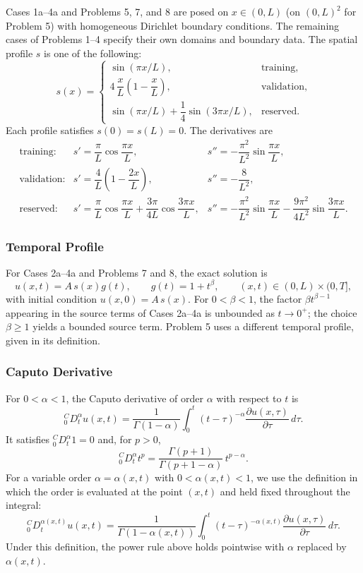 \documentclass[11pt]{article}
\newcommand{\Caputo}[1]{{}^{C}_{0}D_t^{#1}}
\begin{document}
Cases 1a--4a and Problems 5, 7, and 8 are posed on $x\in(0,L)$ (on
$(0,L)^2$ for Problem 5) with homogeneous Dirichlet boundary conditions.
The remaining cases of Problems 1--4 specify their own domains and
boundary data. The spatial
profile $s$ is one of the following:
\[
s(x)=
\begin{cases}
\sin(\pi x/L),
& \text{training},\\[4pt]
4\,\dfrac{x}{L}\left(1-\dfrac{x}{L}\right),
& \text{validation},\\[6pt]
\sin(\pi x/L)+\dfrac14\sin(3\pi x/L),
& \text{reserved}.
\end{cases}
\]
Each profile satisfies $s(0)=s(L)=0$. The derivatives are
\[
\begin{array}{lll}
\text{training:} &
s'=\dfrac{\pi}{L}\cos\dfrac{\pi x}{L}, &
s''=-\dfrac{\pi^2}{L^2}\sin\dfrac{\pi x}{L},\\[10pt]
\text{validation:} &
s'=\dfrac{4}{L}\left(1-\dfrac{2x}{L}\right), &
s''=-\dfrac{8}{L^2},\\[10pt]
\text{reserved:} &
s'=\dfrac{\pi}{L}\cos\dfrac{\pi x}{L}+\dfrac{3\pi}{4L}\cos\dfrac{3\pi x}{L}, &
s''=-\dfrac{\pi^2}{L^2}\sin\dfrac{\pi x}{L}-\dfrac{9\pi^2}{4L^2}\sin\dfrac{3\pi x}{L}.
\end{array}
\]

\subsubsection*{Temporal Profile}

For Cases 2a--4a and Problems 7 and 8, the exact solution is
\[
u(x,t)=A\,s(x)g(t),
\qquad
g(t)=1+t^\beta,
\qquad
(x,t)\in(0,L)\times(0,T],
\]
with initial condition $u(x,0)=A\,s(x)$. For $0<\beta<1$, the factor
$\beta t^{\beta-1}$ appearing in the source terms of Cases 2a--4a is
unbounded as $t\to0^+$; the choice $\beta\ge1$ yields a bounded source
term. Problem 5 uses a different temporal profile, given in its
definition.

\subsubsection*{Caputo Derivative}

For $0<\alpha<1$, the Caputo derivative of order $\alpha$ with respect to
$t$ is
\[
\Caputo{\alpha}u(x,t)
=
\frac{1}{\Gamma(1-\alpha)}
\int_0^t (t-\tau)^{-\alpha}
\frac{\partial u(x,\tau)}{\partial \tau}\,d\tau .
\]
It satisfies $\Caputo{\alpha}1=0$ and, for $p>0$,
\[
\Caputo{\alpha}t^p
=
\frac{\Gamma(p+1)}{\Gamma(p+1-\alpha)}\,
t^{p-\alpha}.
\]
For a variable order $\alpha=\alpha(x,t)$ with $0<\alpha(x,t)<1$, we use
the definition in which the order is evaluated at the point $(x,t)$ and
held fixed throughout the integral:
\[
\Caputo{\alpha(x,t)}u(x,t)
=
\frac{1}{\Gamma(1-\alpha(x,t))}
\int_0^t (t-\tau)^{-\alpha(x,t)}
\frac{\partial u(x,\tau)}{\partial \tau}\,d\tau .
\]
Under this definition, the power rule above holds pointwise with
$\alpha$ replaced by $\alpha(x,t)$.
\end{document}
